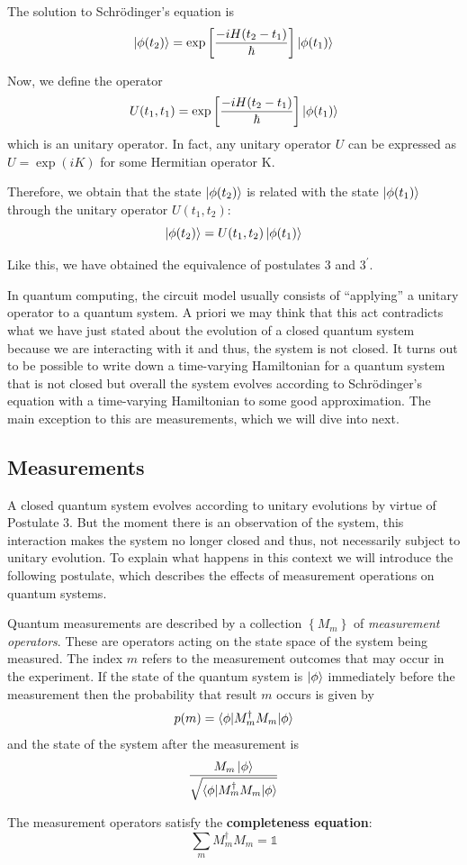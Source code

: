 The solution to Schrödinger's equation is
$$\ket{\phi(t_2)} = \exp{\left[ \frac{-i H(t_2-t_1)}{\hbar}\right] } \ket{\phi(t_1)}$$

Now, we define the operator 
$$U(t_1, t_1) = \exp{\left[ \frac{-i H(t_2-t_1)}{\hbar}\right] } \ket{\phi(t_1)}$$
which is an unitary operator. In fact, any unitary operator $U$ can be expressed as $U=\exp (iK)$ for some Hermitian operator K. 

Therefore, we obtain that the state $\ket{\phi(t_2)}$ is related with the state $\ket{\phi(t_1)}$ through the unitary operator $U(t_1, t_2)$:
$$\ket{\phi(t_2)} = U(t_1,t_2) \ket{\phi(t_1)}$$

Like this, we have obtained the equivalence of postulates $3$ and $3^\prime$.

In quantum computing, the circuit model usually consists of ``applying'' a unitary operator to a quantum system. A priori we may think that this act contradicts what we have just stated about the evolution of a closed quantum system because we are interacting with it and thus, the system is not closed. It turns out to be possible to write down a time-varying Hamiltonian for a quantum system that is not closed but overall the system evolves according to Schrödinger's equation with a time-varying Hamiltonian to some good approximation. The main exception to this are measurements, which we will dive into next.

\subsection{Measurements}\label{sec: measurements}
A closed quantum system evolves according to unitary evolutions by virtue of Postulate 3. But the moment there is an observation of the system, this interaction makes the system no longer closed and thus, not necessarily subject to unitary evolution. To explain what happens in this context we will introduce the following postulate, which describes the effects of measurement operations on quantum systems.

\begin{tcolorbox}[title=Postulate $4$]

    Quantum measurements are described by a collection $\left\lbrace M_m \right\rbrace$ of \textit{measurement operators}. These are operators acting on the state space of the system being measured. The index $m$ refers to the measurement outcomes that may occur in the experiment. If the state of the quantum system is $\ket{\phi}$ immediately before the measurement then the probability that result $m $ occurs is given by 
    $$p(m) = \braket{\phi | M_m^{\dag}M_m | \phi }$$
    and the state of the system after the measurement is 
    $$\frac{M_m \ket{\phi}}{\sqrt{\braket{\phi | M_m^{\dag}M_m | \phi }}}$$

    The measurement operators satisfy the \textbf{completeness equation}:
    $$\sum_m M_m^{\dag}M_m = \mathbb{1}$$
    
\end{tcolorbox}

